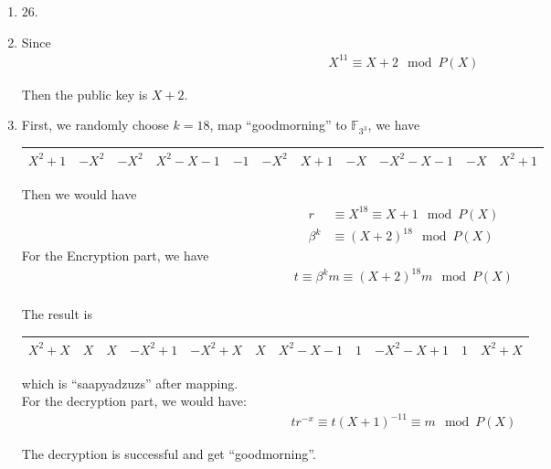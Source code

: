 \documentclass[a4paper,12pt]{journal}
\begin{document}
\begin{enumerate}
	\item  $26$.
	
	\item Since
	\begin{align*}
		X^{11} \equiv X + 2 \mod P(X)
	\end{align*}
	\par Then the public key is $X + 2$.
	
	\newpage
	\item First, we randomly choose $k = 18$, map ``goodmorning'' to $\mathbb{F}_{3^{3}}$, we have
	\begin{table}[!ht]
		\centering
		\footnotesize
		\begin{tabular}{|c|c|c|c|c|c|c|c|c|c|c|}
			\hline
			$X^2 + 1$ & $-X^2$ & $-X^2$ & $X^2 - X - 1$ & $-1$ & $-X^2$ & $X + 1$ & $-X$ & $- X^2 - X - 1$ & $-X$ & $X^2 + 1$ \\
			\hline
		\end{tabular}
	\end{table}
	\par Then we would have
	\begin{align*}
		r &\equiv X^{18} \equiv X + 1 \mod P(X) \\
		\beta^{k} &\equiv (X+2)^{18} \mod P(X)
	\end{align*}
For the Encryption part, we have
	\begin{align*}
		t \equiv \beta^{k}m \equiv (X+2)^{18}m \mod P(X) \\
	\end{align*}
	\par The result is
	\begin{table}[!ht]
		\centering
		\footnotesize
		\begin{tabular}{|c|c|c|c|c|c|c|c|c|c|c|}
			\hline
			$X^2 + X$ & $X$ & $X$ & $-X^2 + 1$ & $-X^{2} + X$ & $X$ & $X^{2} -X - 1$ & $1$ & $- X^2 - X + 1$ & $1$ & $X^2 + X$ \\
			\hline
		\end{tabular}
	\end{table}
	
	which is ``saapyadzuzs'' after mapping.\\
For the decryption part, we would have:
	\begin{align*}
		tr^{-x} \equiv t(X+1)^{-11} \equiv m \mod P(X)
	\end{align*}
	\par The decryption is successful and get ``goodmorning''.
\end{enumerate}
\end{document}
